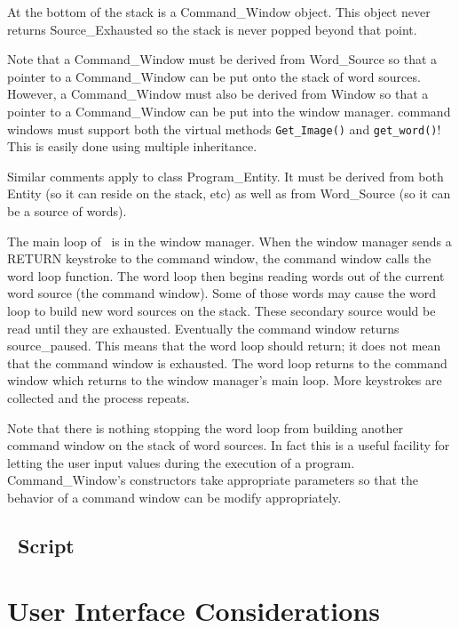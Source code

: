 \documentclass{report}
\begin{document}
At the bottom of the stack is a Command\_Window object. This object never returns
Source\_Exhausted so the stack is never popped beyond that point.

Note that a Command\_Window must be derived from Word\_Source so that a pointer to a
Command\_Window can be put onto the stack of word sources. However, a Command\_Window must also
be derived from Window so that a pointer to a Command\_Window can be put into the window
manager. command windows must support both the virtual methods \texttt{Get\_Image()} and
\texttt{get\_word()}! This is easily done using multiple inheritance.

Similar comments apply to class Program\_Entity. It must be derived from both Entity (so it can reside on the stack, etc) as well as from Word\_Source (so it can be a source of words).

The main loop of \CLAC\ is in the window manager. When the window manager sends a RETURN
keystroke to the command window, the command window calls the word loop function. The word loop
then begins reading words out of the current word source (the command window). Some of those
words may cause the word loop to build new word sources on the stack. These secondary source
would be read until they are exhausted. Eventually the command window returns source\_paused.
This means that the word loop should return; it does not mean that the command window is
exhausted. The word loop returns to the command window which returns to the window manager's
main loop. More keystrokes are collected and the process repeats.

Note that there is nothing stopping the word loop from building another command window on the
stack of word sources. In fact this is a useful facility for letting the user input values
during the execution of a program. Command\_Window's constructors take appropriate parameters so
that the behavior of a command window can be modify appropriately.

\section{\CLAC\ Script}

\chapter{User Interface Considerations}
\end{document}
